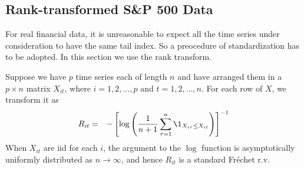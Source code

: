 \subsection{Rank-transformed S\&P 500 Data}

For real financial data, it is unreasonable to expect all
the time series under consideration to have the same tail index. So a
preocedure of standardization has to be adopted. In this section we
use the rank transform.

Suppose we have $p$ time series each of length $n$ and have arranged
them in a $p\times n$ matrix $X_{it}$, where $i = 1, 2, \dots, p$ and
$t=1,2, \dots, n$. For each row of $X$, we transform it as
\begin{eqnarray*}
  R_{it} &=& -\left[
    \log \left({1 \over n+1} \sum_{\tau=1}^n \1_{X_{i\tau} \leq X_{it}} \right)
  \right]^{-1}
\end{eqnarray*}
When $X_{it}$ are iid for each $i$, the argument to the $\log$
function is asymptotically uniformly distributed as $n \to \infty$,
and hence $R_{it}$ is a standard Fr\'echet r.v.

